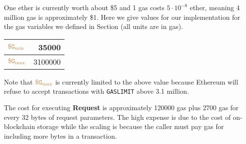 One ether is currently worth about \$5 and 1 gas costs $5 \cdot 10^{-8}$ ether, meaning 4 million gas is approximately \$1.
Here we give values for our implementation for the gas variables we defined in Section  (all units are in gas).
\begin{center}
  \begin{tabular}{lr}
    \hline
    $\tt {\color{brown} \$G_\text{min} }$ & \num[group-separator={,}]{35000} \\
    \hline
    $\tt {\color{brown} \$G_\text{max} }$ & \num[group-separator={,}]{3100000} \\
    \hline
  \end{tabular}
\end{center}
Note that $\tt {\color{brown} \$G_\text{max} }$ is currently limited to the above value because Ethereum will refuse to accept transactions with {\tt GASLIMIT} above 3.1 million.


The cost for executing {\bf Request} is approximately \num[group-separator={,}]{120000} gas plus \num[group-separator={,}]{2700} gas for every 32 bytes of request parameters.
The high expense is due to the cost of on-blockchain storage
while the scaling is because the caller must pay gas for including more bytes in a transaction.


